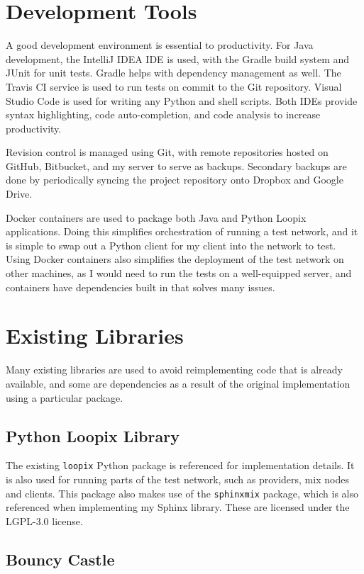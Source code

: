 \documentclass[final,dissertation.tex]{subfiles}
\begin{document}
\section{Development Tools}

A good development environment is essential to productivity. For Java development, the IntelliJ IDEA IDE is used,  with the Gradle build system and JUnit for unit tests. Gradle helps with dependency management as well. The Travis CI service is used to run tests on commit to the Git repository. Visual Studio Code is used for writing any Python and shell scripts. Both IDEs provide syntax highlighting, code auto-completion, and code analysis to increase productivity.

Revision control is managed using Git, with remote repositories hosted on GitHub, Bitbucket, and my server to serve as backups. Secondary backups are done by periodically syncing the project repository onto Dropbox and Google Drive.

Docker containers are used to package both Java and Python Loopix applications. Doing this simplifies orchestration of running a test network, and it is simple to swap out a Python client for my client into the network to test. Using Docker containers also simplifies the deployment of the test network on other machines, as I would need to run the tests on a well-equipped server, and containers have dependencies built in that solves many issues.

\section{Existing Libraries}

Many existing libraries are used to avoid reimplementing code that is already available, and some are dependencies as a result of the original implementation using a particular package.

\subsection{Python Loopix Library}

The existing \verb|loopix| Python package is referenced for implementation details. It is also used for running parts of the test network, such as providers, mix nodes and clients. This package also makes use of the \verb|sphinxmix| package, which is also referenced when implementing my Sphinx library. These are licensed under the LGPL-3.0 license.

\subsection{Bouncy Castle}
\label{sec:bouncy}
\end{document}
